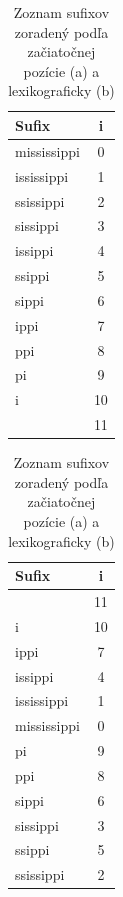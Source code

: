 \begin{table}
    \begin{subtable}{.5\linewidth}
        \centering
        \begin{tabular}{ l c }
            \toprule
            Sufix   & i \\
            \midrule
            mississippi & 0 \\
            ississippi & 1 \\
            ssissippi & 2 \\
            sissippi & 3 \\
            issippi & 4 \\
            ssippi & 5 \\
            sippi & 6 \\
            ippi & 7 \\
            ppi & 8 \\
            pi & 9 \\
            i & 10 \\
             & 11 \\
            \toprule
        \end{tabular}
        \caption{}
        \label{subtable:suffix_array_suffixes_by_i}
    \end{subtable}
    \begin{subtable}{.5\linewidth}
        \centering
        \begin{tabular}{ l c }
            \toprule
            Sufix   & i \\
            \midrule
             & 11 \\
            i & 10 \\
            ippi & 7 \\
            issippi & 4 \\
            ississippi & 1 \\
            mississippi & 0 \\
            pi & 9 \\
            ppi & 8 \\
            sippi & 6 \\
            sissippi & 3 \\
            ssippi & 5 \\
            ssissippi & 2 \\
            \toprule
        \end{tabular}
        \caption{}
        \label{subtable:suffix_array_suffixes_lexi}
    \end{subtable}
    \caption{Zoznam sufixov zoradený podľa začiatočnej pozície (a) a lexikograficky (b)}
    \label{table:suffix_array_suffixes}
\end{table}

